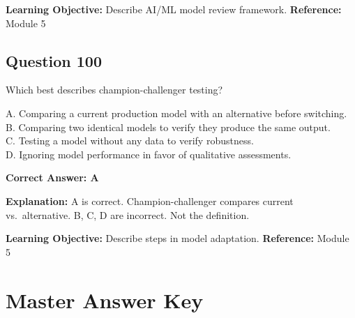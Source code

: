 \documentclass[11pt]{article}
\begin{document}
	\textbf{Learning Objective:} Describe AI/ML model review framework.
	\textbf{Reference:} Module 5
	
	\subsection*{Question 100}
	Which best describes champion-challenger testing?
	
	A. Comparing a current production model with an alternative before
	switching.\\
	B. Comparing two identical models to verify they produce the same output.\\
	C. Testing a model without any data to verify robustness.\\
	D. Ignoring model performance in favor of qualitative assessments.
	
	\vspace{0.4em}
	\textbf{Correct Answer: A}
	
	\textbf{Explanation:}
	A is correct. Champion-challenger compares current vs.\ alternative.
	B, C, D are incorrect. Not the definition.
	
	\textbf{Learning Objective:} Describe steps in model adaptation.
	\textbf{Reference:} Module 5
	
	\newpage
	\section*{Master Answer Key}
	
\end{document}
